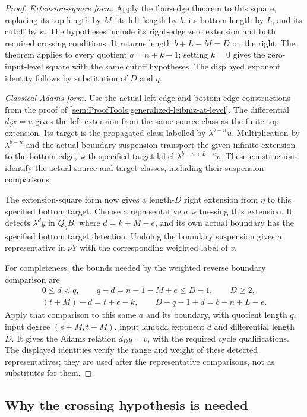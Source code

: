 \begin{proof}
\textit{Extension-square form.}
Apply the four-edge theorem to this square, replacing its top length
by $M$, its left length by $b$, its bottom length by $L$, and its
cutoff by $\kappa$. The hypotheses include its right-edge zero
extension and both required crossing conditions. It returns length
$b+L-M=D$ on the right. The theorem applies to every quotient
$q=n+k-1$; setting $k=0$ gives the zero-input-level square with the
same cutoff hypotheses. The displayed exponent identity follows by
substitution of $D$ and $q$.

\textit{Classical Adams form.}
Use the actual left-edge and bottom-edge constructions from the
proof of \ref{sem:ProofTools:generalized-leibniz-at-level}. The
differential $d_bx=u$ gives the left extension from the same source
class as the finite top extension. Its target is the propagated
class labelled by $\lambda^{b-n}u$. Multiplication by
$\lambda^{b-n}$ and the actual boundary suspension transport the
given infinite extension to the bottom edge, with specified target
label $\lambda^{b-n+L-e}v$. These constructions identify the actual
source and target classes, including their suspension comparisons.

The extension-square form now gives a length-$D$ right extension
from $\eta$ to this specified bottom target. Choose a representative
$a$ witnessing this extension. It detects $\lambda^d y$ in $Q_qB$,
where $d=k+M-e$, and its own actual boundary has the specified
bottom target detection. Undoing the boundary suspension gives a
representative in $\nu Y$ with the corresponding weighted label
of $v$.

For completeness, the bounds needed by the weighted reverse
boundary comparison are
\[
\begin{gathered}
0\le d<q,\qquad
q-d=n-1-M+e\le D-1,\qquad D\ge2,\\
(t+M)-d=t+e-k,\qquad
D-q-1+d=b-n+L-e.
\end{gathered}
\]
Apply that comparison to this same $a$ and its boundary, with quotient
length $q$, input degree $(s+M,t+M)$, input lambda exponent $d$ and
differential length $D$. It gives the Adams relation
$d_Dy=v$, with the required cycle qualifications. The displayed
identities verify the range and weight of these detected
representatives; they are used after the representative comparisons,
not as substitutes for them.
\end{proof}

\subsection{Why the crossing hypothesis is needed}

